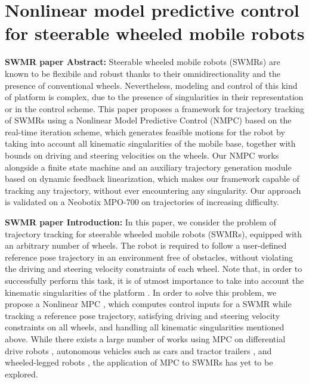 \chapter{Nonlinear model predictive control for steerable wheeled mobile robots}

\textbf{SWMR paper Abstract:}
Steerable wheeled mobile robots (SWMRs) are known to be flexibile and robust
thanks to their omnidirectionality and the presence of conventional wheels.
Nevertheless, modeling and control of this kind of platform is complex, due
to the presence of singularities in their representation or in the control
scheme. This paper proposes a framework for trajectory tracking of SWMRs using
a Nonlinear Model Predictive Control (NMPC) based on the real-time iteration
scheme, which generates feasible motions for the robot by taking into account
all kinematic singularities of the mobile base, together with bounds on driving
and steering velocities on the wheels. Our NMPC works alongside a finite state
machine and an auxiliary trajectory generation module based on dynamic feedback
linearization, which makes our framework capable of tracking any trajectory,
without ever encountering any singularity. Our approach is validated on a
Neobotix MPO-700 on trajectories of increasing difficulty.

\textbf{SWMR paper Introduction:}
In this paper, we consider the problem of trajectory tracking for steerable
wheeled mobile robots (SWMRs), equipped with an arbitrary number of wheels.
The robot is required to follow a user-defined reference pose trajectory in
an environment free of obstacles, without violating the driving and steering
velocity constraints of each wheel. Note that, in order to successfully perform
this task, it is of utmost importance to take into account the kinematic
singularities of the platform \cite{Sorour2019RAS}. In order to solve this
problem, we propose a Nonlinear MPC \cite{Rawlings2017MPCBook}, which computes
control inputs for a SWMR while tracking a reference pose trajectory,
satisfying driving and steering velocity constraints on all wheels, and handling
all kinematic singularities mentioned above. While there exists a large number
of works using MPC on differential drive robots \cite{Tarantos2023Springer},
autonomous vehicles such as cars \cite{Zanon2014Springer} and tractor trailers
\cite{Beglini2022TMECH}, and wheeled-legged robots \cite{Bjelonic2021IROS},
the application of MPC to SWMRs has yet to be explored.

